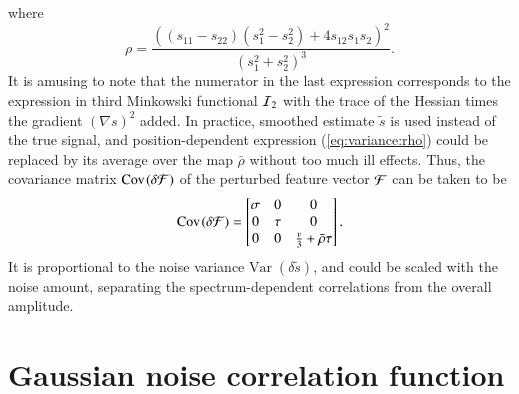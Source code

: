 \documentclass{aa}
\newcommand{\var}[1]{{\textrm{Var}\;\!(#1)}}
\newcommand{\cov}[1]{{\textrm{Cov}\;\!(#1)}}
\begin{document}
%
where
%
\begin{equation} \label{eq:variance:rho}
  \rho = \frac{\left( (s_{11}-s_{22})(s_1^2 - s_2^2) + 4s_{12} s_1 s_2 \right)^2}{(s_1^2 + s_2^2)^3} .
\end{equation}
%
It is amusing to note that the numerator in the last expression corresponds to the expression in third Minkowski functional ${\cal I}_2$ with the trace of the Hessian times the gradient $(\nabla s)^2$ added. In practice, smoothed estimate $\tilde{s}$ is used instead of the true signal, and position-dependent expression (\ref{eq:variance:rho}) could be replaced by its average over the map $\bar{\rho}$ without too much ill effects. Thus, the covariance matrix $\cov{\delta{\cal F}}$ of the perturbed feature vector ${\cal F}$ can be taken to be
%
\begin{equation}
  \cov{\delta{\cal F}} = \left[\begin{matrix}
    \sigma & 0 & 0\\
    0 & \tau & 0\\
    0 & 0 & \frac{v}{3} + \bar{\rho}\tau
  \end{matrix}\right] .
\end{equation}
%
It is proportional to the noise variance $\var{\delta\tilde{s}}$, and could be scaled with the noise amount, separating the spectrum-dependent correlations from the overall amplitude.

\section{Gaussian noise correlation function}
\label{sec:app:correlation}
\end{document}
